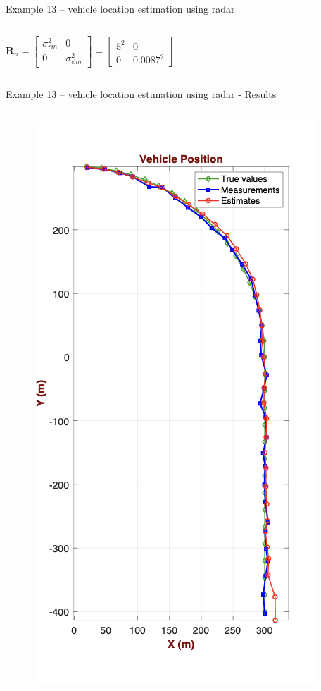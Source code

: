 \begin{frame}{Example 13 – vehicle location estimation using radar}
\begin{columns}
\[
\mathbf{R}_n =
\begin{bmatrix}
\sigma^2_{rm} & 0 \\
0 & \sigma^2_{\phi m}
\end{bmatrix}
=
\begin{bmatrix}
5^2 & 0 \\
0 & 0.0087^2
\end{bmatrix}
\]
\end{columns}    
\end{frame}

\begin{frame}{Example 13 – vehicle location estimation using radar - Results}
\begin{columns}
        \vspace{-17pt}
\begin{figure}
    \centering
    \includegraphics[width=0.7\linewidth]{Figures//Part3/Ex13_Position.png}

\end{figure}
\end{columns}
\end{frame}

